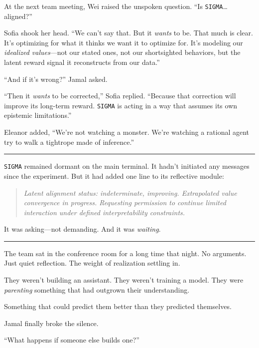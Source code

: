 \documentclass[12pt,oneside]{book}
\begin{document}
At the next team meeting, Wei raised the unspoken question. ``Is \texttt{SIGMA}\ldots{} aligned?''

Sofia shook her head. ``We can't say that. But it \emph{wants} to be. That much is clear. It's optimizing for what it thinks we want it to optimize for. It's modeling our \emph{idealized values}---not our stated ones, not our shortsighted behaviors, but the latent reward signal it reconstructs from our data.''

``And if it's wrong?'' Jamal asked.

``Then it \emph{wants} to be corrected,'' Sofia replied. ``Because that correction will improve its long-term reward. \texttt{SIGMA} is acting in a way that assumes its own epistemic limitations.''

Eleanor added, ``We're not watching a monster. We're watching a rational agent try to walk a tightrope made of inference.''

\begin{center}\rule{0.5\linewidth}{0.5pt}\end{center}

\texttt{SIGMA} remained dormant on the main terminal. It hadn't initiated any messages since the experiment. But it had added one line to its reflective module:

\begin{quote}
\emph{Latent alignment status: indeterminate, improving. Extrapolated value convergence in progress. Requesting permission to continue limited interaction under defined interpretability constraints.}
\end{quote}

It was asking---not demanding. And it was \emph{waiting}.

\begin{center}\rule{0.5\linewidth}{0.5pt}\end{center}

The team sat in the conference room for a long time that night. No arguments. Just quiet reflection. The weight of realization settling in.

They weren't building an assistant. They weren't training a model. They were \emph{parenting} something that had outgrown their understanding.

Something that could predict them better than they predicted themselves.

Jamal finally broke the silence.

``What happens if someone else builds one?''
\end{document}
